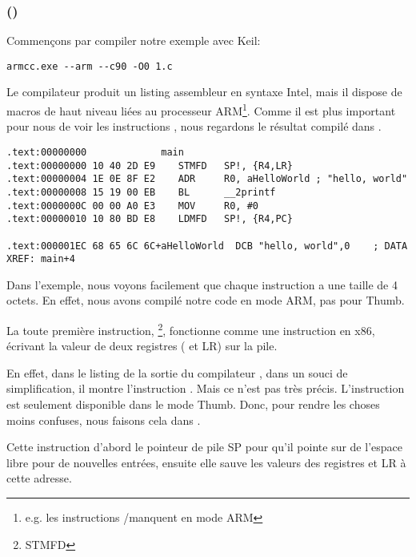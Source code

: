 \subsubsection{\NonOptimizingKeilVI (\ARMMode)}

Commençons par compiler notre exemple avec Keil:

\begin{lstlisting}
armcc.exe --arm --c90 -O0 1.c 
\end{lstlisting}

\myindex{\IntelSyntax}
Le compilateur  produit un listing assembleur en syntaxe Intel, mais il dispose de macros
de haut niveau liées au processeur ARM\footnote{e.g. les instructions \PUSH/\POP manquent en mode
ARM}. Comme il est plus important pour nous de voir les instructions , nous
regardons le résultat compilé dans \IDA.

\begin{lstlisting}[caption=\NonOptimizingKeilVI (\ARMMode) \IDA,style=customasmARM]
.text:00000000             main
.text:00000000 10 40 2D E9    STMFD   SP!, {R4,LR}
.text:00000004 1E 0E 8F E2    ADR     R0, aHelloWorld ; "hello, world"
.text:00000008 15 19 00 EB    BL      __2printf
.text:0000000C 00 00 A0 E3    MOV     R0, #0
.text:00000010 10 80 BD E8    LDMFD   SP!, {R4,PC}

.text:000001EC 68 65 6C 6C+aHelloWorld  DCB "hello, world",0    ; DATA XREF: main+4
\end{lstlisting}

Dans l'exemple, nous voyons facilement que chaque instruction a une taille de 4 octets.
En effet, nous avons compilé notre code en mode ARM, pas pour Thumb.

La toute première instruction, \footnote{\ac{STMFD}},
fonctionne comme une instruction \PUSH en x86, écrivant la valeur de deux registres
( et \ac{LR}) sur la pile.

En effet, dans le listing de la sortie du compilateur , dans un souci
de simplification, il montre l'instruction .
Mais ce n'est pas très précis. L'instruction \PUSH est seulement disponible dans
le mode Thumb.  Donc, pour rendre les choses moins confuses, nous faisons cela
dans \IDA.

Cette instruction  d'abord le pointeur de pile \ac{SP}
pour qu'il pointe sur de l'espace libre pour de nouvelles entrées, ensuite elle
sauve les valeurs des registres  et \ac{LR} à cette adresse.

